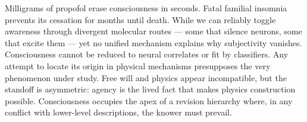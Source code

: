 Milligrams of propofol erase consciousness in seconds. Fatal familial insomnia prevents its cessation for months until death. While we can reliably toggle awareness through divergent molecular routes — some that silence neurons, some that excite them — yet no unified mechanism explains why subjectivity vanishes. Consciousness cannot be reduced to neural correlates or fit by classifiers. Any attempt to locate its origin in physical mechanisms presupposes the very phenomenon under study. Free will and physics appear incompatible, but the standoff is asymmetric: agency is the lived fact that makes physics construction possible. Consciousness occupies the apex of a revision hierarchy where, in any conflict with lower-level descriptions, the knower must prevail.